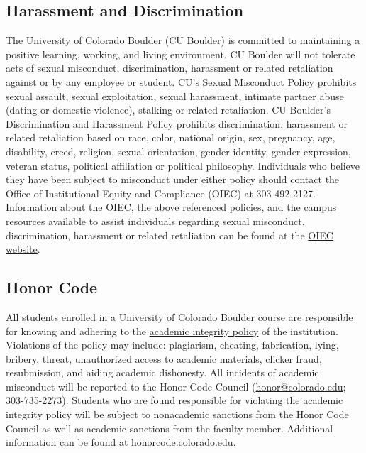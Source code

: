 \documentclass[10pt]{memoir}
\begin{document}
\subsection{Harassment and Discrimination}
The University of Colorado Boulder (CU Boulder) is committed to maintaining a positive learning, working, and living environment. CU Boulder will not tolerate acts of sexual misconduct, discrimination, harassment or related retaliation against or by any employee or student. CU's \href{http://www.colorado.edu/policies/discrimination-and-harassment-policy-and-procedures}{Sexual Misconduct Policy} prohibits sexual assault, sexual exploitation, sexual harassment, intimate partner abuse (dating or domestic violence), stalking or related retaliation. CU Boulder's \href{http://www.colorado.edu/policies/discrimination-and-harassment-policy-and-procedures}{Discrimination and Harassment Policy} prohibits discrimination, harassment or related retaliation based on race, color, national origin, sex, pregnancy, age, disability, creed, religion, sexual orientation, gender identity, gender expression, veteran status, political affiliation or political philosophy. Individuals who believe they have been subject to misconduct under either policy should contact the Office of Institutional Equity and Compliance (OIEC) at 303-492-2127. Information about the OIEC, the above referenced policies, and the campus resources available to assist individuals regarding sexual misconduct, discrimination, harassment or related retaliation can be found at the \href{http://www.colorado.edu/institutionalequity/}{OIEC website}.

\subsection{Honor Code}
All students enrolled in a University of Colorado Boulder course are responsible for knowing and adhering to the \href{http://www.colorado.edu/policies/academic-integrity-policy}{academic integrity policy} of the institution. Violations of the policy may include: plagiarism, cheating, fabrication, lying, bribery, threat, unauthorized access to academic materials, clicker fraud, resubmission, and aiding academic dishonesty. All incidents of academic misconduct will be reported to the Honor Code Council (\href{mailto:honor@colorado.edu}{honor@colorado.edu}; 303-735-2273). Students who are found responsible for violating the academic integrity policy will be subject to nonacademic sanctions from the Honor Code Council as well as academic sanctions from the faculty member. Additional information can be found at \href{http://honorcode.colorado.edu}{honorcode.colorado.edu}. 
\end{document}
